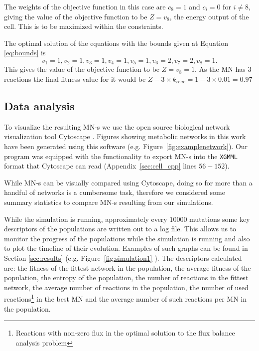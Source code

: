 \documentclass[a4paper,12pt]{article}
\begin{document}
	The weights of the objective function in this case are $c_8=1$ and $c_i=0$ for $i\neq 8$, giving the value of the objective function to be $Z=v_8$, the energy output of the cell. This is to be maximized within the constraints.

	The optimal solution of the equations with the bounds given at Equation \ref{eq:bounds} is 
	\begin{equation}\label{eq:solution}
		v_1=1 , v_2=1, v_3=1, v_4=1, v_5=1, v_6=2, v_7=2, v_8=1.
	\end{equation}
	This gives the value of the objective function to be $Z=v_8=1$. As the MN has $3$ reactions the final fitness value for it would be $Z-3\times k_{reac}=1-3\times 0.01=0.97$
\subsection{Data analysis}
\label{sub:visualization}

To visualize the resulting MN-s we use the open source biological network visualization tool Cytoscape \cite{cytoscape}. Figures showing metabolic networks in this work have been generated using this software (e.g. Figure~\ref{fig:examplenetwork}). Our program was equipped with the functionality to export MN-s into the \texttt{XGMML} format that Cytoscape can read (Appendix~\ref{sec:cell_cpp} lines $56-152$). 

While MN-s can be visually compared using Cytoscape, doing so for more than a handful of networks is a cumbersome task, therefore we considered some summary statistics to compare MN-s resulting from our simulations.

While the simulation is running, approximately every $10000$ mutations some key descriptors of the populations are written out to a log file. This allows us to monitor the progress of the populations while the simulation is running and also to plot the timeline of their evolution. Examples of such graphs can be found in Section \ref{sec:results} (e.g. Figure~\ref{fig:simulation1} ). The descriptors calculated are: the fitness of the fittest network in the population, the average fitness of the population, the entropy of the population, the number of reactions in the fittest network, the average number of reactions in the population, the number of used reactions\footnote{Reactions with non-zero flux in the optimal solution to the flux balance analysis problem} in the best MN and the average number of such reactions per MN in the population. 
\end{document}
